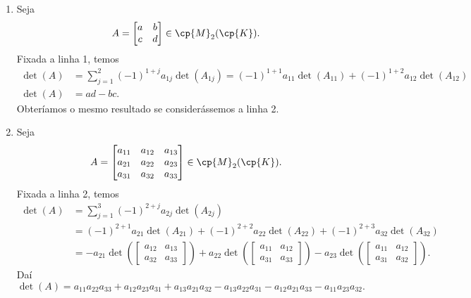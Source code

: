 \begin{exemplo}
	\begin{enumerate}[label={\arabic*})]
		\item Seja
		\[
			A =
			\begin{bmatrix}
				a & b\\
				c & d
			\end{bmatrix} \in \cp{M}_2(\cp{K}).
		\]
		Fixada a linha 1, temos
		\begin{align*}
			\det(A) &= \sum_{j = 1}^2(-1)^{1 + j}a_{1j}\det(A_{1j}) = (-1)^{1 + 1}a_{11}\det(A_{11}) + (-1)^{1 + 2}a_{12}\det(A_{12})\\
			\det(A) &= ad - bc.
	    \end{align*}
		Obteríamos o mesmo resultado se considerássemos a linha 2.

		\item Seja
		\[
			A =
			\begin{bmatrix}
				a_{11} & a_{12} & a_{13}\\
				a_{21} & a_{22} & a_{23}\\
				a_{31} & a_{32} & a_{33}
			\end{bmatrix} \in \cp{M}_2(\cp{K}).
		\]
		Fixada a linha 2, temos
		\begin{align*}
			\det(A) &= \sum_{j = 1}^3(-1)^{2 + j}a_{2j}\det(A_{2j}) \\ &= (-1)^{2 + 1}a_{21}\det(A_{21}) + (-1)^{2 + 2}a_{22}\det(A_{22}) + (-1)^{2 + 3}a_{32}\det(A_{32})\\ &= -a_{21}\det\left(\begin{bmatrix}a_{12} & a_{13}\\a_{32} & a_{33}\end{bmatrix}\right) + a_{22}\det\left(\begin{bmatrix}a_{11} & a_{12}\\a_{31} & a_{33}\end{bmatrix}\right) - a_{23}\det\left(\begin{bmatrix}a_{11} & a_{12}\\a_{31} & a_{32}\end{bmatrix}\right).
		\end{align*}
		Daí
		\[
			\det(A) = a_{11}a_{22}a_{33} + a_{12}a_{23}a_{31} + a_{13}a_{21}a_{32} - a_{13}a_{22}a_{31} - a_{12}a_{21}a_{33} - a_{11}a_{23}a_{32}.
		\]


\end{enumerate}
\end{exemplo}
